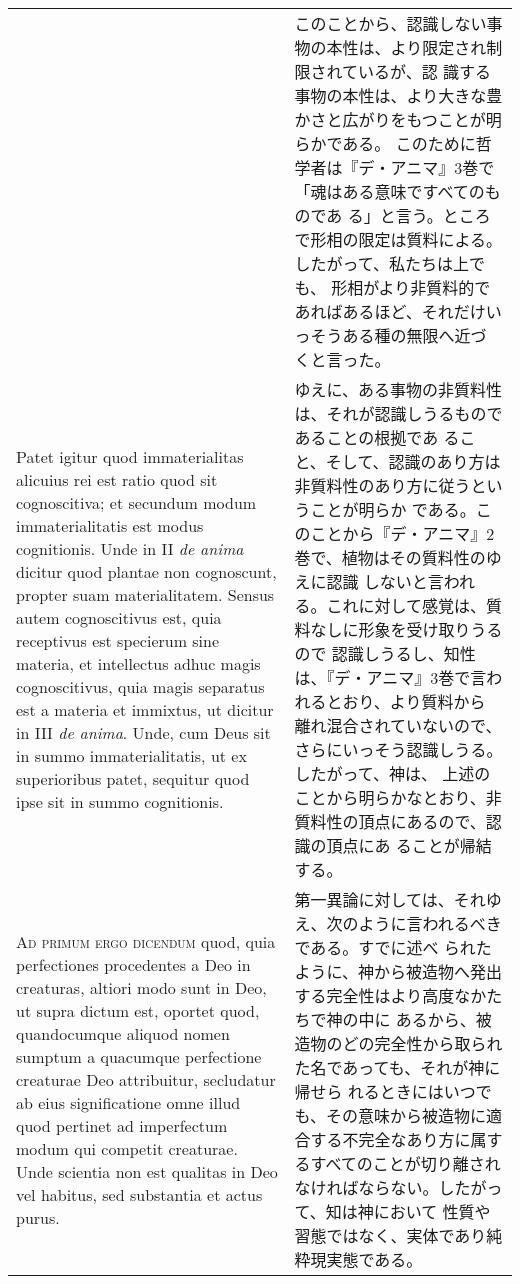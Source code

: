 \documentclass[10pt]{jsarticle} %
\begin{document}
\begin{longtable}{p{21em}p{21em}}
&

このことから、認識しない事物の本性は、より限定され制限されているが、認
識する事物の本性は、より大きな豊かさと広がりをもつことが明らかである。
このために哲学者は『デ・アニマ』3巻で「魂はある意味ですべてのものであ
る」と言う。ところで形相の限定は質料による。したがって、私たちは上でも、
形相がより非質料的であればあるほど、それだけいっそうある種の無限へ近づ
くと言った。


\\

Patet igitur quod immaterialitas alicuius rei est ratio quod sit
cognoscitiva; et secundum modum immaterialitatis est modus
cognitionis. Unde in II {\itshape de anima} dicitur quod plantae non
cognoscunt, propter suam materialitatem. Sensus autem cognoscitivus est,
quia receptivus est specierum sine materia, et intellectus adhuc magis
cognoscitivus, quia magis separatus est a materia et immixtus, ut
dicitur in III {\itshape de anima}. Unde, cum Deus sit in summo
immaterialitatis, ut ex superioribus patet, sequitur quod ipse sit in
summo cognitionis.

&

ゆえに、ある事物の非質料性は、それが認識しうるものであることの根拠であ
ること、そして、認識のあり方は非質料性のあり方に従うということが明らか
である。このことから『デ・アニマ』2巻で、植物はその質料性のゆえに認識
しないと言われる。これに対して感覚は、質料なしに形象を受け取りうるので
認識しうるし、知性は、『デ・アニマ』3巻で言われるとおり、より質料から
離れ混合されていないので、さらにいっそう認識しうる。したがって、神は、
上述のことから明らかなとおり、非質料性の頂点にあるので、認識の頂点にあ
ることが帰結する。



\\

{\scshape Ad primum ergo dicendum} quod, quia perfectiones procedentes a
Deo in creaturas, altiori modo sunt in Deo, ut supra dictum est, oportet
quod, quandocumque aliquod nomen sumptum a quacumque perfectione
creaturae Deo attribuitur, secludatur ab eius significatione omne illud
quod pertinet ad imperfectum modum qui competit creaturae. Unde scientia
non est qualitas in Deo vel habitus, sed substantia et actus purus.

&


第一異論に対しては、それゆえ、次のように言われるべきである。すでに述べ
られたように、神から被造物へ発出する完全性はより高度なかたちで神の中に
あるから、被造物のどの完全性から取られた名であっても、それが神に帰せら
れるときにはいつでも、その意味から被造物に適合する不完全なあり方に属す
るすべてのことが切り離されなければならない。したがって、知は神において
性質や習態ではなく、実体であり純粋現実態である。



\end{longtable}
\end{document}
